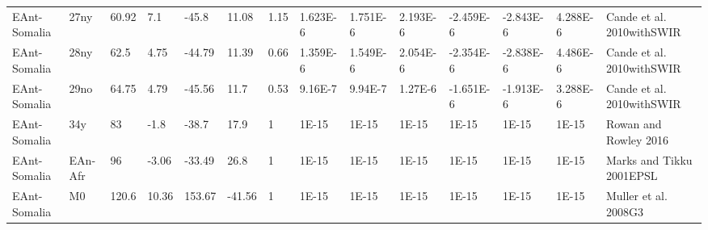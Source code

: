\begin{landscape}
\begin{longtable}{@{}lllllllllllllp{3.5cm}@{}}
EAnt-Somalia & 27ny & 60.92 & 7.1 & -45.8 & 11.08 & 1.15 & 1.623E-6 & 1.751E-6 & 2.193E-6 & -2.459E-6 & -2.843E-6 & 4.288E-6 & Cande et al. 2010withSWIR \\
EAnt-Somalia & 28ny & 62.5 & 4.75 & -44.79 & 11.39 & 0.66 & 1.359E-6 & 1.549E-6 & 2.054E-6 & -2.354E-6 & -2.838E-6 & 4.486E-6 & Cande et al. 2010withSWIR \\
EAnt-Somalia & 29no & 64.75 & 4.79 & -45.56 & 11.7 & 0.53 & 9.16E-7 & 9.94E-7 & 1.27E-6 & -1.651E-6 & -1.913E-6 & 3.288E-6 & Cande et al. 2010withSWIR \\
EAnt-Somalia & 34y & 83 & -1.8 & -38.7 & 17.9 & 1 & 1E-15 & 1E-15 & 1E-15 & 1E-15 & 1E-15 & 1E-15 & Rowan and Rowley 2016 \\
EAnt-Somalia & EAn-Afr & 96 & -3.06 & -33.49 & 26.8 & 1 & 1E-15 & 1E-15 & 1E-15 & 1E-15 & 1E-15 & 1E-15 & Marks and Tikku 2001EPSL \\
EAnt-Somalia & M0 & 120.6 & 10.36 & 153.67 & -41.56 & 1 & 1E-15 & 1E-15 & 1E-15 & 1E-15 & 1E-15 & 1E-15 & Muller et al. 2008G3 \\* \bottomrule
\end{longtable}
\end{landscape}
